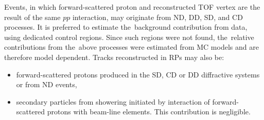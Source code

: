 Events, in which  forward-scattered proton and reconstructed TOF
vertex are the result of the same $pp$ interaction, may originate from \ac{ND}, \ac{DD}, \ac{SD}, and \ac{CD} processes.  It is preferred to estimate the~background contribution from data, using dedicated control regions.
Since such regions were not found, the~relative contributions from the~above processes were  estimated from MC models and are therefore model dependent. Tracks reconstructed in \ac{RP}s  %
may also be:
\begin{itemize}
	\item forward-scattered protons produced in the \ac{SD}, \ac{CD} or \ac{DD} diffractive systems or from \ac{ND} events,
	\item secondary particles from showering initiated 
	by interaction of forward-scattered protons with beam-line elements. This contribution is negligible.
\end{itemize}


